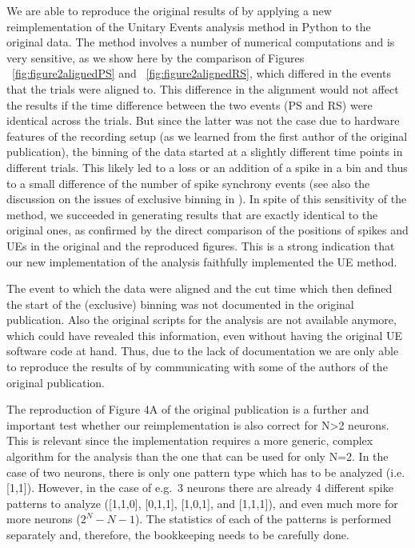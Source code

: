 \documentclass[10pt,a4paper,onecolumn]{article}
\begin{document}
We are able to reproduce the original results of \autocite{Riehle97} by
applying a new reimplementation of the Unitary Events analysis method in
Python to the original data. The method involves a number of numerical
computations and is very sensitive, as we show here by the comparison of
Figures ~\ref{fig:figure2alignedPS} and ~\ref{fig:figure2alignedRS},
which differed in the events that the trials were aligned to. This
difference in the alignment would not affect the results if the time
difference between the two events (PS and RS) were identical across the
trials. But since the latter was not the case due to hardware features
of the recording setup (as we learned from the first author of the
original publication), the binning of the data started at a slightly
different time points in different trials. This likely led to a loss or
an addition of a spike in a bin and thus to a small difference of the
number of spike synchrony events (see also the discussion on the issues
of exclusive binning in \autocite{Gruen99}). In spite of this
sensitivity of the method, we succeeded in generating results that are
exactly identical to the original ones, as confirmed by the direct
comparison of the positions of spikes and UEs in the original and the
reproduced figures. This is a strong indication that our new
implementation of the analysis faithfully implemented the UE method.

The event to which the data were aligned and the cut time which then
defined the start of the (exclusive) binning was not documented in the
original publication. Also the original scripts for the analysis are not
available anymore, which could have revealed this information, even
without having the original UE software code at hand. Thus, due to the
lack of documentation we are only able to reproduce the results of
\autocite{Riehle97} by communicating with some of the authors of the
original publication.

The reproduction of Figure 4A of the original publication is a further
and important test whether our reimplementation is also correct for
N\textgreater{}2 neurons. This is relevant since the implementation
requires a more generic, complex algorithm for the analysis than the one
that can be used for only N=2. In the case of two neurons, there is only
one pattern type which has to be analyzed (i.e. {[}1,1{]}). However, in
the case of e.g.~3 neurons there are already 4 different spike patterns
to analyze ({[}1,1,0{]}, {[}0,1,1{]}, {[}1,0,1{]}, and {[}1,1,1{]}), and
even much more for more neurons (\(2^{N}-N-1\)). The statistics of each
of the patterns is performed separately and, therefore, the bookkeeping
needs to be carefully done.
\end{document}
